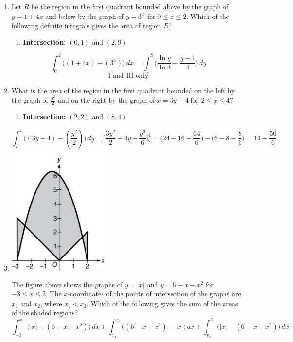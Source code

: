 \documentclass[12pt]{article}
\begin{document}
\begin{enumerate}
    \item Let $R$ be the region in the first quadrant bounded above by the graph of $y=1+4x$ and below by the graph of $y=3^x$ for $0 \leq x \leq 2$. Which of the following definite integrals gives the area of region $R$?
    \begin{enumerate}
        \item \textbf{Intersection:} $(0,1)$ and $(2,9)$
    \end{enumerate}
$$\int_{0}^{2} \big((1+4x)-(3^x) \big) \, dx = \int_{1}^{9} \bigg( \frac{\ln y}{\ln 3} - \frac{y-1}{4} \biggr)\, dy $$
$$\boxed{\text{I and III only}}$$


    \item What is the area of the region in the first quadrant bounded on the left by the graph of $\frac{y^2}{2}$ and on the right by the graph of $x=3y-4$ for $2 \leq x \leq 4$?
    \begin{enumerate}
        \item \textbf{Intersection:} $(2,2)$ and $(8,4)$
    \end{enumerate}
    $$\int_{2}^{4} \biggr((3y-4)-(\frac{y^2}{2}) \biggr) \,dy = \biggr[ \frac{3y^2}{2}-4y-\frac{y^3}{6}\biggr]_{2}^{4} = \biggr(24-16-\frac{64}{6}\biggr) - \biggr(6-8-\frac{8}{6}\biggr)= \boxed{10-\frac{56}{6}}$$
    
    \item 
    \begin{center}
        \includegraphics[width=2in]{4.012.png}
    \end{center}
    The figure above shows the graphs of $y=|x|$ and $y=6-x-x^2$ for $-3 \leq x \leq 2$. The $x$-coordinates of the points of intersection of the graphs are $x_1$ and $x_2$, where $x_1<x_2$. Which of the following gives the sum of the areas of the shaded regions?
    $$\boxed{\int_{-3}^{x_1}\big(|x|-(6-x-x^2)\big) \,dx + \int_{x_1}^{x_2}\big( (6-x-x^2)-|x|\big)\,dx + \int_{x_2}^{2}\big(|x|-(6-x-x^2)\big) \,dx}$$

\end{enumerate}
\end{document}
